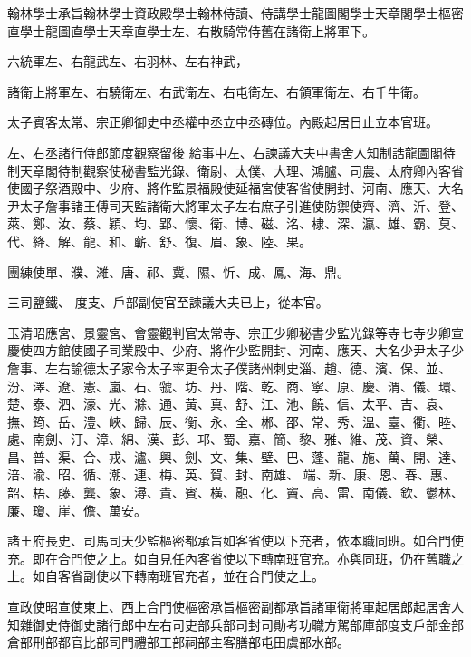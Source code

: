 \begin{pinyinscope}
 翰林學士承旨翰林學士資政殿學士翰林侍讀、侍講學士龍圖閣學士天章閣學士樞密直學士龍圖直學士天章直學士左、右散騎常侍舊在諸衛上將軍下。



 六統軍左、右龍武左、右羽林、左右神武，



 諸衛上將軍左、右驍衛左、右武衛左、右屯衛左、右領軍衛左、右千牛衛。



 太子賓客太常、宗正卿御史中丞權中丞立中丞磚位。內殿起居日止立本官班。



 左、右丞諸行侍郎節度觀察留後
 給事中左、右諫議大夫中書舍人知制誥龍圖閣待制天章閣待制觀察使秘書監光錄、衛尉、太僕、大理、鴻臚、司農、太府卿內客省使國子祭酒殿中、少府、將作監景福殿使延福宮使客省使開封、河南、應天、大名尹太子詹事諸王傅司天監諸衛大將軍太子左右庶子引進使防禦使齊、濟、沂、登、萊、鄭、汝、蔡、穎、均、郢、懷、衛、博、磁、洺、棣、深、瀛、雄、霸、莫、代、絳、解、龍、和、蘄、舒、復、眉、象、陸、果。



 團練使單、濮、濰、唐、祁、冀、隰、忻、成、鳳、海、鼎。



 三司鹽鐵、
 度支、戶部副使官至諫議大夫已上，從本官。



 玉清昭應宮、景靈宮、會靈觀判官太常寺、宗正少卿秘書少監光錄等寺七寺少卿宣慶使四方館使國子司業殿中、少府、將作少監開封、河南、應天、大名少尹太子少詹事、左右諭德太子家令太子率更令太子僕諸州刺史淄、趙、德、濱、保、並、汾、澤、遼、憲、嵐、石、虢、坊、丹、階、乾、商、寧、原、慶、渭、儀、環、楚、泰、泗、濠、光、滁、通、黃、真、舒、江、池、饒、信、太平、吉、袁、撫、筠、岳、澧、峽、歸、辰、衡、永、全、郴、邵、常、秀、溫、臺、衢、睦、處、南劍、汀、漳、綿、漢、彭、邛、蜀、嘉、簡、黎、雅、維、茂、資、榮、昌、普、渠、合、戎、瀘、興、劍、文、集、壁、巴、蓬、龍、施、萬、開、達、涪、渝、昭、循、潮、連、梅、英、賀、封、南雄、
 端、新、康、恩、春、惠、韶、梧、藤、龔、象、潯、貴、賓、橫、融、化、竇、高、雷、南儀、欽、鬱林、廉、瓊、崖、儋、萬安。



 諸王府長史、司馬司天少監樞密都承旨如客省使以下充者，依本職同班。如合門使充。即在合門使之上。如自見任內客省使以下轉南班官充。亦與同班，仍在舊職之上。如自客省副使以下轉南班官充者，並在合門使之上。



 宣政使昭宣使東上、西上合門使樞密承旨樞密副都承旨諸軍衛將軍起居郎起居舍人知雜御史侍御史諸行郎中左右司吏部兵部司封司勛考功職方駕部庫部度支戶部金部倉部刑部都官比部司門禮部工部祠部主客膳部屯田虞部水部。




\end{pinyinscope}
